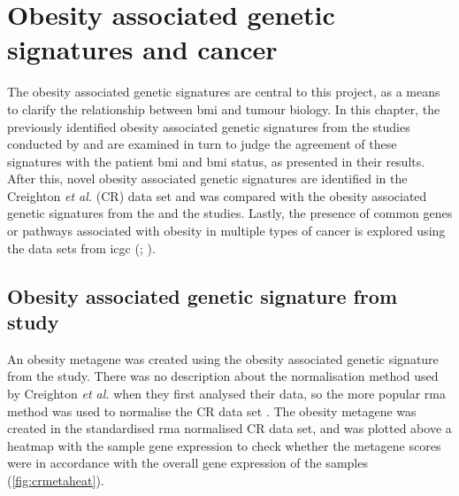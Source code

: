 \chapter{Obesity associated genetic signatures and cancer}
\label{cha:obesity_genetic_signatures_and_cancer}

The obesity associated genetic signatures are central to this project, as a means to clarify the relationship between \gls{bmi} and tumour biology.
In this chapter, the previously identified obesity associated genetic signatures from the studies conducted by \citet{Creighton2012} and \citet{Fuentes-Mattei2014} are examined in turn to judge the agreement of these signatures with the patient \gls{bmi} and \gls{bmi} status, as presented in their results.
After this, novel obesity associated genetic signatures are identified in the Creighton \textit{et al.} (CR) data set and was compared with the obesity associated genetic signatures from the \citet{Creighton2012} and the \citet{Fuentes-Mattei2014}  studies.
Lastly, the presence of common genes or pathways associated with obesity in multiple types of cancer is explored using the data sets from \gls{icgc} (; \citealp{Zhang2011}).

\section{Obesity associated genetic signature from \citet{Creighton2012} study}
\label{sec:creighton_obesity_metagene}

An obesity metagene was created using the obesity associated genetic signature from the \citet{Creighton2012} study.
There was no description about the normalisation method used by Creighton \textit{et al.} when they first analysed their data, so the more popular \gls{rma} method  was used to  normalise the CR data set \citep{Irizarry2003}.
The obesity metagene was created in the standardised \gls{rma} normalised CR data set, and  was plotted above a heatmap with the sample gene expression  to check whether the metagene scores were in accordance with the overall gene expression of the samples (\cref{fig:crmetaheat}).

